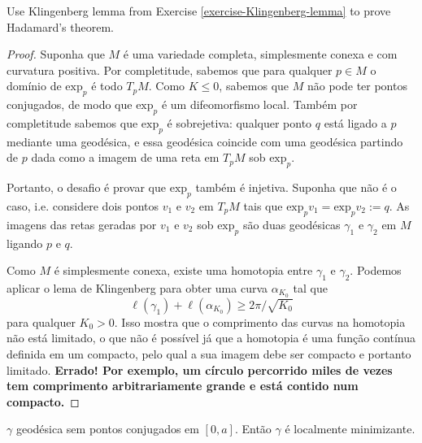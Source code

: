 \begin{exercise}
\label{exercise-Hadamard-via-Kingenberg}
Use Klingenberg lemma from Exercise \ref{exercise-Klingenberg-lemma} to prove
Hadamard's theorem.
\end{exercise}

\begin{proof}
Suponha que $M$ é uma variedade completa, simplesmente conexa e com curvatura
positiva. Por completitude, sabemos que para qualquer $p \in M$ o domínio de
$\text{exp}_p$ é todo $T_pM$. Como $K\leq 0$, sabemos que $M$
não pode ter pontos conjugados, de modo que $\text{exp}_p$ é um
difeomorfismo local. Também por completitude sabemos que
$\text{exp}_p$ é sobrejetiva: qualquer ponto $q$ está ligado a $p$
mediante uma geodésica, e essa geodésica coincide com uma geodésica partindo de
$p$ dada como a imagem de uma reta em $T_pM$ sob $\text{exp}_p$.

Portanto, o desafio é provar que $\text{exp}_p$ também é injetiva.
Suponha que não é o caso, i.e. considere dois pontos $v_1$ e $v_2$ em
$T_pM$ tais que $\text{exp}_pv_1=\text{exp}_pv_2:=q$. As
imagens das retas geradas por $v_1$ e $v_2$ sob $\text{exp}_p$ são
duas geodésicas $\gamma_1$ e $\gamma_2$ em $M$ ligando $p$ e $q$.

Como $M$ é simplesmente conexa, existe uma homotopia entre $\gamma_1$ e
$\gamma_2$. Podemos aplicar o lema de Klingenberg para obter uma curva
$\alpha_{K_0}$ tal que $$ \ell(\gamma_1)+\ell(\alpha_{K_0}) \geq
2\pi/\sqrt{K_0} $$ para qualquer $K_0>0$. Isso mostra que o comprimento das
curvas na homotopia não está limitado, o que não é possível já que a homotopia é
uma função contínua definida em um compacto, pelo qual a sua imagem debe ser
compacto e portanto limitado. {\bf Errado! Por exemplo, um círculo percorrido
miles de vezes tem comprimento arbitrariamente grande e está contido num
compacto.}
\end{proof}

\begin{exercise}
\label{exercise-geodesica-sem-pontos-conjugados-e-localmente-minimizante}
$\gamma$ geodésica sem pontos conjugados em $[0,a]$. Então $\gamma$ é localmente
minimizante.
\end{exercise}

